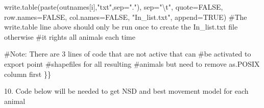 \documentclass[
  letterpaper,
]{book}
\newenvironment{Shaded}{\begin{snugshade}}{\end{snugshade}}
\newcommand{\AttributeTok}[1]{\textcolor[rgb]{0.40,0.45,0.13}{#1}}
\newcommand{\CommentTok}[1]{\textcolor[rgb]{0.37,0.37,0.37}{#1}}
\newcommand{\ConstantTok}[1]{\textcolor[rgb]{0.56,0.35,0.01}{#1}}
\newcommand{\FunctionTok}[1]{\textcolor[rgb]{0.28,0.35,0.67}{#1}}
\newcommand{\NormalTok}[1]{\textcolor[rgb]{0.00,0.23,0.31}{#1}}
\newcommand{\SpecialCharTok}[1]{\textcolor[rgb]{0.37,0.37,0.37}{#1}}
\newcommand{\StringTok}[1]{\textcolor[rgb]{0.13,0.47,0.30}{#1}}
\begin{document}
\begin{Shaded}
\begin{Highlighting}[]
    \FunctionTok{write.table}\NormalTok{(}\FunctionTok{paste}\NormalTok{(outnames[i],}\StringTok{"txt"}\NormalTok{,}\AttributeTok{sep=}\StringTok{"."}\NormalTok{), }\AttributeTok{sep=}\StringTok{"}\SpecialCharTok{\textbackslash{}t}\StringTok{"}\NormalTok{, }\AttributeTok{quote=}\ConstantTok{FALSE}\NormalTok{, }\AttributeTok{row.names=}\ConstantTok{FALSE}\NormalTok{, }
      \AttributeTok{col.names=}\ConstantTok{FALSE}\NormalTok{, }\StringTok{"In\_list.txt"}\NormalTok{, }\AttributeTok{append=}\ConstantTok{TRUE}\NormalTok{)}
\CommentTok{\#The write.table line above should only be run once to create the In\_list.txt file otherwise }
\CommentTok{\#it rights all animals each time}
  
\CommentTok{\#Note: There are 3 lines of code that are not active that can \#be activated to export point }
\CommentTok{\#shapefiles for all resulting \#animals but need to remove as.POSIX column first}
\NormalTok{\}\}}
\end{Highlighting}
\end{Shaded}

10. Code below will be needed to get NSD and best movement model for
each animal
\end{document}
